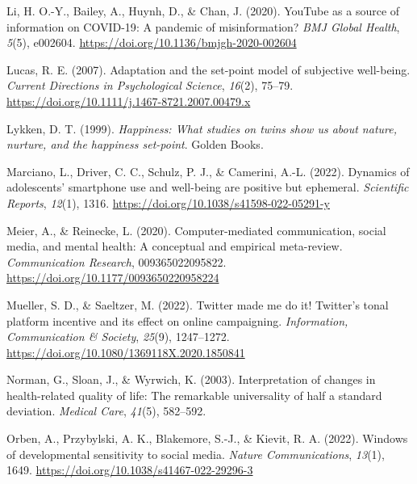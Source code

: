 \documentclass[
  man,mask,floatsintext]{apa7}
\newlength{\cslhangindent}
\newlength{\cslentryspacingunit} %
\newenvironment{CSLReferences}[2] %
 {%
  \setlength{\parindent}{0pt}
  \ifodd #1
  \let\oldpar\par
  \def\par{\hangindent=\cslhangindent\oldpar}
  \fi
  \setlength{\parskip}{#2\cslentryspacingunit}
 }%
 {}
\begin{document}
\begin{CSLReferences}{1}{0}
\leavevmode{}%
Li, H. O.-Y., Bailey, A., Huynh, D., \& Chan, J. (2020). {YouTube} as a source of information on {COVID-19}: A pandemic of misinformation? \emph{BMJ Global Health}, \emph{5}(5), e002604. \url{https://doi.org/10.1136/bmjgh-2020-002604}

\leavevmode{}%
Lucas, R. E. (2007). Adaptation and the set-point model of subjective well-being. \emph{Current Directions in Psychological Science}, \emph{16}(2), 75--79. \url{https://doi.org/10.1111/j.1467-8721.2007.00479.x}

\leavevmode{}%
Lykken, D. T. (1999). \emph{Happiness: {What} studies on twins show us about nature, nurture, and the happiness set-point}. {Golden Books}.

\leavevmode{}%
Marciano, L., Driver, C. C., Schulz, P. J., \& Camerini, A.-L. (2022). Dynamics of adolescents' smartphone use and well-being are positive but ephemeral. \emph{Scientific Reports}, \emph{12}(1), 1316. \url{https://doi.org/10.1038/s41598-022-05291-y}

\leavevmode{}%
Meier, A., \& Reinecke, L. (2020). Computer-mediated communication, social media, and mental health: {A} conceptual and empirical meta-review. \emph{Communication Research}, 009365022095822. \url{https://doi.org/10.1177/0093650220958224}

\leavevmode{}%
Mueller, S. D., \& Saeltzer, M. (2022). Twitter made me do it! {Twitter}'s tonal platform incentive and its effect on online campaigning. \emph{Information, Communication \& Society}, \emph{25}(9), 1247--1272. \url{https://doi.org/10.1080/1369118X.2020.1850841}

\leavevmode{}%
Norman, G., Sloan, J., \& Wyrwich, K. (2003). Interpretation of changes in health-related quality of life: {The} remarkable universality of half a standard deviation. \emph{Medical Care}, \emph{41}(5), 582--592.

\leavevmode{}%
Orben, A., Przybylski, A. K., Blakemore, S.-J., \& Kievit, R. A. (2022). Windows of developmental sensitivity to social media. \emph{Nature Communications}, \emph{13}(1), 1649. \url{https://doi.org/10.1038/s41467-022-29296-3}


\end{CSLReferences}
\end{document}
